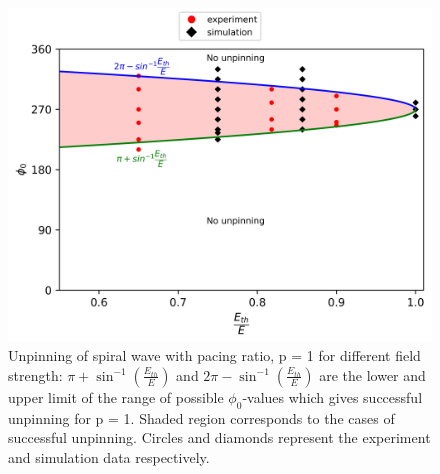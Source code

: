 %
\begin{figure}[htb!]
    \centering
	\includegraphics[width=\columnwidth]{p1.png}
    \caption{Unpinning of spiral wave with pacing ratio, p = 1 for different
	field strength: $\pi+{\sin^{-1}}{(\frac{E_{th}}{E})}$ and
	$2\pi-{\sin^{-1}}{(\frac{E_{th}}{E})}$ are the lower and upper limit of
	the range of possible ${\phi}_0$-values which gives successful
	unpinning for p = 1. Shaded region corresponds to the cases of
	successful unpinning.
    Circles and diamonds represent the experiment and simulation data
	respectively.} 
	\label{fig:unpinning_p1}
\end{figure}




